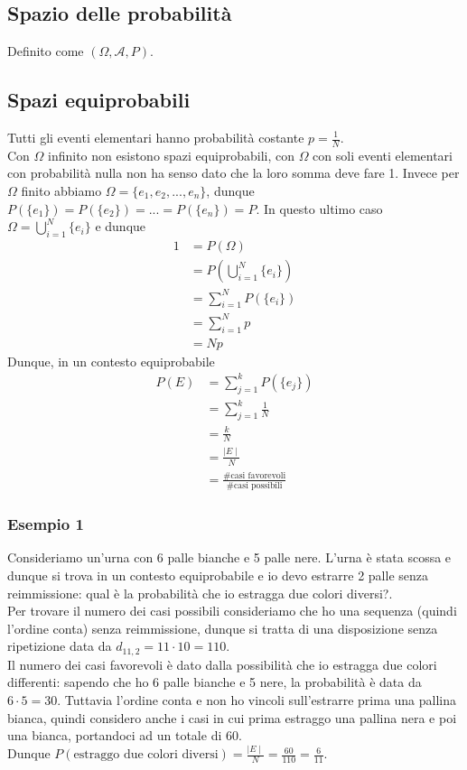 \documentclass[11pt]{report}
\begin{document}
\subsection{Spazio delle probabilità}
Definito come $(\Omega, \mathcal{A}, P)$.
\subsection{Spazi equiprobabili}
Tutti gli eventi elementari hanno probabilità costante $p = \frac{1}{N}$.\\
Con $\Omega$ infinito non esistono spazi equiprobabili, con $\Omega$ con soli eventi elementari con probabilità nulla non ha senso dato che la loro somma deve fare 1. Invece per $\Omega$ finito abbiamo $\Omega = \{e_1, e_2,..., e_n\}$, dunque $P(\{e_1\}) = P(\{e_2\}) = ... = P(\{e_n\}) = P$. In questo ultimo caso $\Omega = \bigcup_{i=1}^{N}\{e_i\}$ e dunque
\begin{equation}
    \begin{split}
        1 & = P(\Omega)\\
        & = P \left( \bigcup_{i=1}^{N}\{e_i\} \right )\\
        & = \sum_{i=1}^{N}P \left( \{e_i\} \right)\\
        & = \sum_{i=1}^{N}p\\
        & = Np
    \end{split}
\end{equation}
Dunque, in un contesto equiprobabile
\begin{equation}
    \begin{split}
        P(E) & = \sum_{j=1}^{k}P \left( \{e_j\} \right)\\
        & = \sum_{j=1}^{k} \frac{1}{N}\\
        & = \frac{k}{N}\\
        & = \frac{\mid E \mid}{N}\\
        & = \frac{\text{\# casi favorevoli}}{\text{\# casi possibili}}
    \end{split}
\end{equation}
\subsubsection{Esempio 1}
Consideriamo un'urna con 6 palle bianche e 5 palle nere. L'urna è stata scossa e dunque si trova in un contesto equiprobabile e io devo estrarre 2 palle senza reimmissione: qual è la probabilità che io estragga due colori diversi?.\\
Per trovare il numero dei casi possibili consideriamo che ho una sequenza (quindi l'ordine conta) senza reimmissione, dunque si tratta di una disposizione senza ripetizione data da $d_{11,2} = 11 \cdot 10 = 110$.\\
Il numero dei casi favorevoli è dato dalla possibilità che io estragga due colori differenti: sapendo che ho 6 palle bianche e 5 nere, la probabilità è data da $6 \cdot 5 = 30$. Tuttavia l'ordine conta e non ho vincoli sull'estrarre prima una pallina bianca, quindi considero anche i casi in cui prima estraggo una pallina nera e poi una bianca, portandoci ad un totale di 60.\\
Dunque $P(\text{estraggo due colori diversi}) = \frac{\mid E \mid}{N} = \frac{60}{110} = \frac{6}{11}$.
\end{document}
